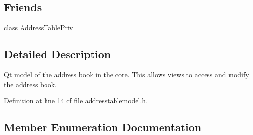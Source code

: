 \subsection*{Friends}
\begin{DoxyCompactItemize}
\item 
class \hyperlink{class_address_table_model_aa3f1055879193511b3a0088db8c1d9ec}{Address\+Table\+Priv}
\end{DoxyCompactItemize}


\subsection{Detailed Description}
Qt model of the address book in the core. This allows views to access and modify the address book. 

Definition at line 14 of file addresstablemodel.\+h.



\subsection{Member Enumeration Documentation}
\hypertarget{class_address_table_model_a06c1665092378384d7115b0d9e9f1846}{}
